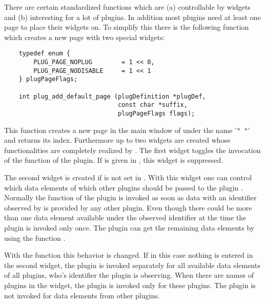 There are certain standardized functions which are (a) controllable
by widgets and (b) interesting for a lot of plugins. In addition
most plugins need at least one page to place their widgets on. To
simplify this there is the following function which creates a new
page with two special widgets:
\label{page:p_default_page}
\begin{small}
\linespread{0.9}
\begin{verbatim}
    typedef enum {
        PLUG_PAGE_NOPLUG        = 1 << 0,
        PLUG_PAGE_NODISABLE     = 1 << 1
    } plugPageFlags;

    int plug_add_default_page (plugDefinition *plugDef,
                               const char *suffix,
                               plugPageFlags flags);
\end{verbatim}
\end{small}
This function creates a new page in the main window of \icewing{}
under the name '\verb|" "|' and
returns its index. Furthermore up to two widgets are created whose
functionalities are completely realized by \icewing{}. The first
widget toggles the invocation of the  function of the
plugin. If  is given in ,
this widget is suppressed.

The second widget is created if  is not set
in . With this widget one can control which data elements
of which other plugins should be passed to the plugin
. Normally the function  of the plugin
 is invoked as soon as data with an identifier observed
by  is provided by any other plugin. Even though there
could be more than one data element available under the observed
identifier at the time the plugin is invoked only once. The plugin
can get the remaining data elements by using the function
.

With the function  this behavior is
changed. If in this case nothing is entered in the second widget,
the plugin is invoked separately for all available data elements of
all plugins, who's identifier the plugin is observing. When there are
names of plugins in the widget, the plugin is invoked only for these
plugins. The plugin is not invoked for data elements from other
plugins.

